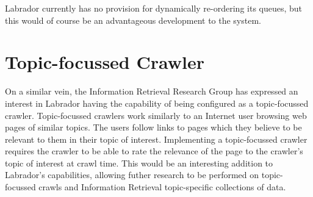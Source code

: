 Labrador currently has no provision for dynamically re-ordering its queues, but this would of course be an advantageous development to the system.


\section{Topic-focussed Crawler}
On a similar vein, the Information Retrieval Research Group has expressed an interest in Labrador having the capability of being configured as a topic-focussed crawler. Topic-focussed crawlers work similarly to an Internet user browsing web pages of similar topics. The users follow links to pages which they believe to be relevant to them in their topic of interest. Implementing a topic-focussed crawler requires the crawler to be able to rate the relevance of the page to the crawler's topic of interest at crawl time\cite{ref9}. This would be an interesting addition to Labrador's capabilities, allowing futher research to be performed on topic-focussed crawls and Information Retrieval topic-specific collections of data.

